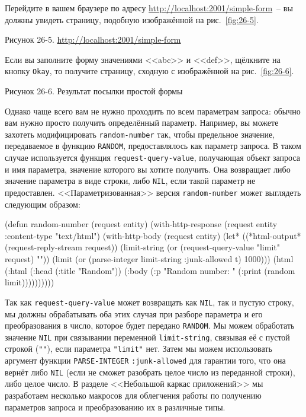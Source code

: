 Перейдите в вашем браузере по адресу \url{http://localhost:2001/simple-form}~-- вы должны
увидеть страницу, подобную изображённой на рис.~\ref{fig:26-5}.

Рисунок 26-5. \url{http://localhost:2001/simple-form}

Если вы заполните форму значениями <<abc>> и <<def>>, щёлкните на кнопку \texttt{Okay}, то
получите страницу, сходную с изображённой на рис.~\ref{fig:26-6}.

Рисунок 26-6. Результат посылки простой формы

Однако чаще всего вам не нужно проходить по всем параметрам запроса: обычно вам нужно
просто получить определённый параметр. Например, вы можете захотеть модифицировать
\lstinline{random-number} так, чтобы предельное значение, передаваемое в функцию
\lstinline{RANDOM}, предоставлялось как параметр запроса. В таком случае используется функция
\lstinline{request-query-value}, получающая объект запроса и имя параметра, значение которого
вы хотите получить. Она возвращает либо значение параметра в виде строки, либо
\lstinline{NIL}, если такой параметр не предоставлен. <<Параметризованная>> версия
\lstinline{random-number} может выглядеть следующим образом:

\begin{myverb}
  (defun random-number (request entity)
    (with-http-response (request entity :content-type "text/html")
      (with-http-body (request entity)
        (let* ((*html-output* (request-reply-stream request))
               (limit-string (or (request-query-value "limit" request) ""))
               (limit (or (parse-integer limit-string :junk-allowed t) 1000)))
          (html
            (:html
              (:head (:title "Random"))
              (:body
                (:p "Random number: " (:print (random limit))))))))))
\end{myverb}

Так как \lstinline{request-query-value} может возвращать как \lstinline{NIL}, так и пустую
строку, мы должны обрабатывать оба этих случая при разборе параметра и его преобразования
в число, которое будет передано \lstinline{RANDOM}. Мы можем обработать значение
\lstinline{NIL} при связывании переменной \lstinline{limit-string}, связывая её с
пустой строкой (\lstinline{""}), если параметра \lstinline{"limit"} нет. Затем мы можем использовать
аргумент функции \lstinline{PARSE-INTEGER} \lstinline{:junk-allowed} для гарантии того,
что она вернёт либо \lstinline{NIL} (если не сможет разобрать целое число из переданной
строки), либо целое число. В разделе <<Небольшой каркас приложений>> мы разработаем
несколько макросов для облегчения работы по получению параметров запроса и преобразованию
их в различные типы.

